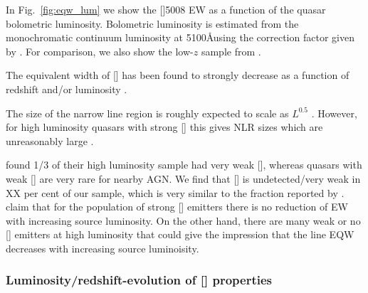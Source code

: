 In Fig.~\ref{fig:eqw_lum} we show the []5008 EW as a function of the quasar bolometric luminosity. 
Bolometric luminosity is estimated from the monochromatic continuum luminosity at 5100\AA using the correction factor given by \citet{richards06}. 
For comparison, we also show the low-$z$ sample from \citet{shen11}.  

The equivalent width of [] has been found to strongly decrease as a function of redshift and/or luminosity \citep[e.g.][]{brotherton96,netzer04,sulentic04,baskin05b}. 

The size of the narrow line region is roughly expected to scale as $L^{0.5}$ \citep[e.g.][]{netzer04}. 
However, for high luminosity quasars with strong [] this gives \ac{NLR} sizes which are unreasonably large \citep[$\sim$100 kpc;][]{netzer04}. 

\citet{netzer04} found 1/3 of their high luminosity sample had very weak [], whereas quasars with weak [] are very rare for nearby \ac{AGN}. 
We find that [] is undetected/very weak in XX per cent of our sample, which is very similar to the fraction reported by \citet{netzer04}.  
\citet{netzer04} claim that for the population of strong [] emitters there is no reduction of EW with increasing source luminosity. 
On the other hand, there are many weak or no [] emitters at high luminosity that could give the impression that the line \ac{EQW} decreases with increasing source luminoisity. 


\subsubsection{Luminosity/redshift-evolution of [] properties}

